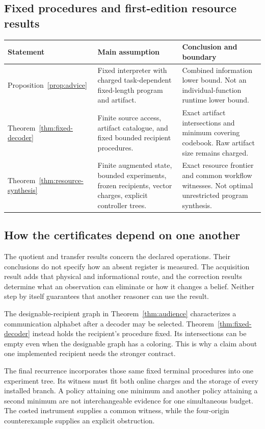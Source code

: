 \documentclass[11pt,letterpaper]{article}
\theoremstyle{plain}
\theoremstyle{definition}
\begin{document}
\subsection{Fixed procedures and first-edition resource results}
\begin{center}\small
\begin{tabularx}{\textwidth}{@{}P{1.1in}P{1.55in}X@{}}\toprule
Statement & Main assumption & Conclusion and boundary\\\midrule
Proposition~\ref{prop:advice} & Fixed interpreter with charged task-dependent fixed-length program and artifact. & Combined information lower bound. Not an individual-function runtime lower bound.\\
Theorem~\ref{thm:fixed-decoder} & Finite source access, artifact catalogue, and fixed bounded recipient procedures. & Exact artifact intersections and minimum covering codebook. Raw artifact size remains charged.\\
Theorem~\ref{thm:resource-synthesis} & Finite augmented state, bounded experiments, frozen recipients, vector charges, explicit controller trees. & Exact resource frontier and common workflow witnesses. Not optimal unrestricted program synthesis.\\\bottomrule
\end{tabularx}\end{center}

\subsection{How the certificates depend on one another}
The quotient and transfer results concern the declared operations. Their conclusions do not specify how an absent register is measured. The acquisition result adds that physical and informational route, and the correction results determine what an observation can eliminate or how it changes a belief. Neither step by itself guarantees that another reasoner can use the result.

The designable-recipient graph in Theorem~\ref{thm:audience} characterizes a communication alphabet after a decoder may be selected. Theorem~\ref{thm:fixed-decoder} instead holds the recipient's procedure fixed. Its intersections can be empty even when the designable graph has a coloring. This is why a claim about one implemented recipient needs the stronger contract.

The final recurrence incorporates those same fixed terminal procedures into one experiment tree. Its witness must fit both online charges and the storage of every installed branch. A policy attaining one minimum and another policy attaining a second minimum are not interchangeable evidence for one simultaneous budget. The costed instrument supplies a common witness, while the four-origin counterexample supplies an explicit obstruction.
\end{document}

